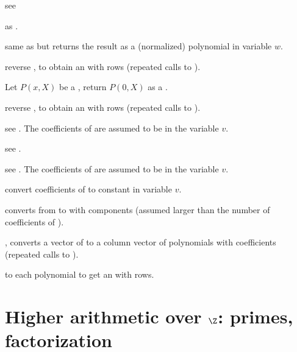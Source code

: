 see 

 as .

 same as
 but returns the result as a (normalized) polynomial
in variable $w$.

 reverse , to obtain
an  with  rows (repeated calls to ).

 Let $P(x,X)$ be a , return $P(0,X)$
as a .

 reverse , to obtain
an  with  rows (repeated calls to ).

 see .
The coefficients of  are assumed to be in the variable $v$.

 see .

 see .
The coefficients of  are assumed to be in the variable $v$.

 convert coefficients of  to
constant  in variable $v$.


 converts from  to 
with  components (assumed larger than the number of coefficients of
).

, converts a vector of  to a column
vector of polynomials with  coefficients (repeated calls to
).



  to each polynomial
to get an  with  rows.

\section{Higher arithmetic over $\Z$: primes, factorization}


